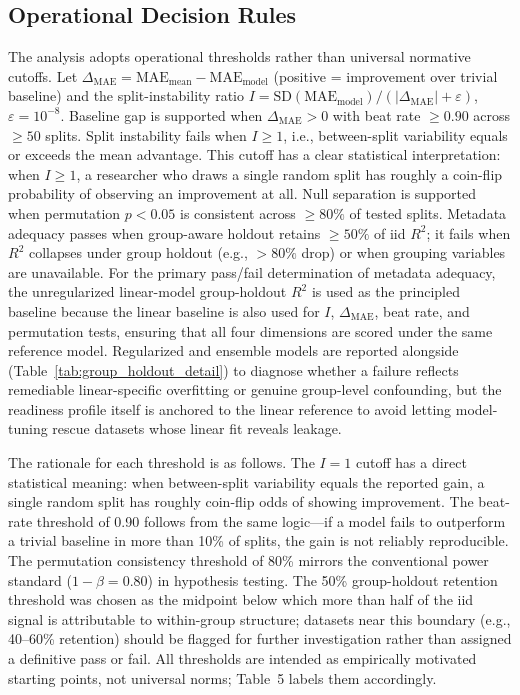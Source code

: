 \documentclass[10pt,letterpaper]{article}
\begin{document}
\subsection{Operational Decision Rules}
The analysis adopts operational thresholds rather than universal normative cutoffs. Let $\Delta_{\mathrm{MAE}} = \mathrm{MAE}_{\text{mean}} - \mathrm{MAE}_{\text{model}}$ (positive = improvement over trivial baseline) and the split-instability ratio $I = \mathrm{SD}(\mathrm{MAE}_{\text{model}}) / (|\Delta_{\mathrm{MAE}}| + \varepsilon)$, $\varepsilon = 10^{-8}$. Baseline gap is supported when $\Delta_{\mathrm{MAE}} > 0$ with beat rate $\geq 0.90$ across $\geq 50$ splits. Split instability fails when $I \geq 1$, i.e., between-split variability equals or exceeds the mean advantage. This cutoff has a clear statistical interpretation: when $I \geq 1$, a researcher who draws a single random split has roughly a coin-flip probability of observing an improvement at all. Null separation is supported when permutation $p < 0.05$ is consistent across $\geq 80\%$ of tested splits. Metadata adequacy passes when group-aware holdout retains $\geq 50\%$ of iid $R^2$; it fails when $R^2$ collapses under group holdout (e.g., $> 80\%$ drop) or when grouping variables are unavailable. For the primary pass/fail determination of metadata adequacy, the unregularized linear-model group-holdout $R^2$ is used as the principled baseline because the linear baseline is also used for $I$, $\Delta_{\mathrm{MAE}}$, beat rate, and permutation tests, ensuring that all four dimensions are scored under the same reference model. Regularized and ensemble models are reported alongside (Table~\ref{tab:group_holdout_detail}) to diagnose whether a failure reflects remediable linear-specific overfitting or genuine group-level confounding, but the readiness profile itself is anchored to the linear reference to avoid letting model-tuning rescue datasets whose linear fit reveals leakage.

The rationale for each threshold is as follows. The $I = 1$ cutoff has a direct statistical meaning: when between-split variability equals the reported gain, a single random split has roughly coin-flip odds of showing improvement. The beat-rate threshold of 0.90 follows from the same logic---if a model fails to outperform a trivial baseline in more than 10\% of splits, the gain is not reliably reproducible. The permutation consistency threshold of 80\% mirrors the conventional power standard ($1 - \beta = 0.80$) in hypothesis testing. The 50\% group-holdout retention threshold was chosen as the midpoint below which more than half of the iid signal is attributable to within-group structure; datasets near this boundary (e.g., 40--60\% retention) should be flagged for further investigation rather than assigned a definitive pass or fail. All thresholds are intended as empirically motivated starting points, not universal norms; Table~5 labels them accordingly.
\end{document}
